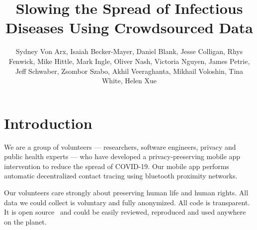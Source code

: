 \documentclass[11pt]{article}
\begin{document}
\title{Slowing the Spread of Infectious Diseases Using Crowdsourced Data}
%
\author{Sydney Von Arx, Isaiah Becker-Mayer, Daniel Blank, Jesse Colligan, Rhys Fenwick, Mike Hittle, Mark Ingle, Oliver Nash, Victoria Nguyen, James Petrie, Jeff Schwaber, Zsombor Szabo, Akhil Veeraghanta, Mikhail Voloshin, Tina White, Helen Xue} 

\maketitle

 


\section{Introduction}

We are a group of volunteers --- researchers, software engineers, privacy and public health experts --- who have developed a privacy-preserving mobile app intervention to reduce the spread of COVID-19. Our mobile app performs automatic decentralized contact tracing using bluetooth proximity networks. 

Our volunteers care strongly about preserving human life and human rights. All data we could collect is voluntary and fully anonymized. All code is transparent. It is open source~\cite{covidwatch} and could be easily reviewed, reproduced and used anywhere on the planet.
\end{document}
